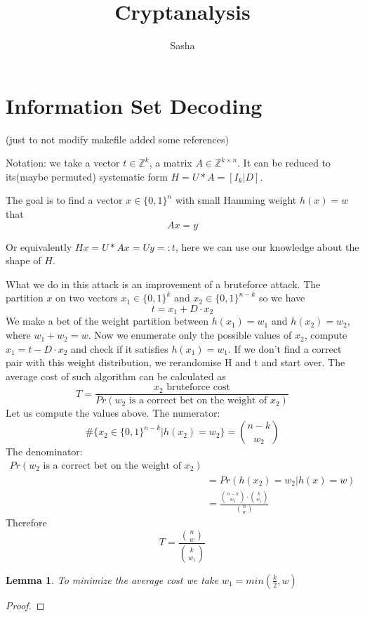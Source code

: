 \documentclass[12pt]{article}
\title{Cryptanalysis}
\author{ Sasha }
\newcommand{\ZZ}{\mathbb{Z}}
\newtheorem{lemma}{Lemma}
\begin{document}
\maketitle

\section{Information Set Decoding}

\cite{[DP19]}(just to not modify makefile added some references)

Notation: we take a vector $t \in \ZZ^{k}$, a matrix $A \in \ZZ^{k \times n}$. It can be reduced to its(maybe permuted) systematic form $H  = U * A = [I_{k}|D]$.


The goal is to find a vector $x \in \{0,1\}^{n}$ with small Hamming weight $h(x) = w$ that
\[
Ax = y
\]

Or equivalently $Hx = U*Ax = Uy =: t$, here we can use our knowledge about the shape of $H$.

What we do in this attack is an improvement of a bruteforce attack. The partition $x$ on two vectors $x_1 \in \{0,1\}^{k}$ and  $x_2  \in \{0,1\}^{n-k}$ so we have
\[
t = x_1 + D \cdot x_2
\]
We make a bet of the weight partition between $h(x_1) = w_1$ and $h(x_2) = w_2$, where $w_1 + w_2 = w$. Now we enumerate only the possible values of $x_2$, compute $x_1 = t - D \cdot x_2$ and check if it satisfies $h(x_1) = w_1$. If we don't find a correct pair with this weight distribution, we rerandomise H and t and start over. The average cost of such algorithm can be calculated as
\[
T = \frac{x_2\text{ bruteforce cost}}{Pr(w_2\text{ is a correct bet on the weight of }x_2)}
\]
Let us compute the values above.
The numerator:
\[
\#\{x_2 \in \{0,1\}^{n-k} | h(x_2) = w_2\} = \binom{n-k}{w_2}
\]
The denominator:
\[
\begin{split}
    Pr(w_2\text{ is a correct bet on the weight of }x_2) & \\
    & = Pr(h(x_2) = w_2|h(x) = w) \\
    & = \frac{\binom{n-k}{w_2} \cdot \binom{k}{w_1}}{\binom{n}{w}}
\end{split}
\]
Therefore
\[
T = \frac{\binom{n}{w}}{\binom{k}{w_1}}
\]
\begin{lemma}
To minimize the average cost we take $w_1 = min(\frac{k}{2}, w)$
\end{lemma}
\begin{proof}

\end{proof}
\end{document}
